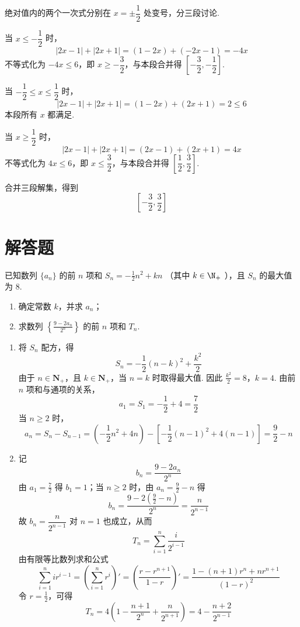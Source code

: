 \begin{solution}
绝对值内的两个一次式分别在 \(x=\pm\dfrac12\) 处变号，分三段讨论.

当 \(x\leqslant-\dfrac12\) 时，
\[
|2x-1|+|2x+1|=(1-2x)+(-2x-1)=-4x
\]
不等式化为 \(-4x\leqslant6\)，即 \(x\geqslant-\dfrac32\)，与本段合并得
\(\left[-\dfrac32,-\dfrac12\right]\).

当 \(-\dfrac12\leqslant x\leqslant\dfrac12\) 时，
\[
|2x-1|+|2x+1|=(1-2x)+(2x+1)=2\leqslant6
\]
本段所有 \(x\) 都满足.

当 \(x\geqslant\dfrac12\) 时，
\[
|2x-1|+|2x+1|=(2x-1)+(2x+1)=4x
\]
不等式化为 \(4x\leqslant6\)，即 \(x\leqslant\dfrac32\)，与本段合并得
\(\left[\dfrac12,\dfrac32\right]\).

合并三段解集，得到
\[
\left[-\frac32,\frac32\right]
\]
\end{solution}

\section{解答题}

\begin{problem}
已知数列 \( \{a_{n}\} \) 的前 \(n\) 项和 \( S_{n} = -\frac{1}{2}n^{2} + kn \) （其中 \( k \in \N_{+} \) ），且 \( S_{n} \) 的最大值为 8.
\begin{enumerate}
\item 确定常数 \( k \)，并求 \( a_{n} \)；
\item 求数列 \( \left\{\frac{9-2a_{n}}{2^{n}}\right\} \) 的前 \(n\) 项和 \( T_{n} \).
\end{enumerate}
\end{problem}

\begin{solution}
\begin{enumerate}
\item 将 \(S_n\) 配方，得
\[
S_n=-\frac12(n-k)^2+\frac{k^2}{2}
\]
由于 \(n\in\mathbf N_+\)，且 \(k\in\mathbf N_+\)，当 \(n=k\) 时取得最大值. 因此
\(\frac{k^2}{2}=8\)，\(k=4\).
由前 \(n\) 项和与通项的关系，
\[
a_1=S_1=-\frac12+4=\frac72
\]
当 \(n\geqslant2\) 时，
\[
a_n=S_n-S_{n-1}
=\left(-\frac12n^2+4n\right)
-\left[-\frac12(n-1)^2+4(n-1)\right]
=\frac92-n
\]
\item 记
\[
b_n=\frac{9-2a_n}{2^n}
\]
由 \(a_1=\frac72\) 得 \(b_1=1\)；当 \(n\geqslant2\) 时，由 \(a_n=\frac92-n\) 得
\[
b_n=\frac{9-2\left(\frac92-n\right)}{2^n}
=\frac{n}{2^{n-1}}
\]
故 \(b_n=\dfrac{n}{2^{n-1}}\) 对 \(n=1\) 也成立，从而
\[
T_n=\sum_{i=1}^n\frac{i}{2^{i-1}}
\]
由有限等比数列求和公式
\[
\sum_{i=1}^n i r^{i-1}
=\left(\sum_{i=1}^n r^i\right)'
=\left(\frac{r-r^{n+1}}{1-r}\right)'
=\frac{1-(n+1)r^n+nr^{n+1}}{(1-r)^2}
\]
令 \(r=\frac12\)，可得
\[
T_n
=4\left(1-\frac{n+1}{2^n}+\frac{n}{2^{n+1}}\right)
=4-\frac{n+2}{2^{n-1}}
\]
\end{enumerate}
\end{solution}

